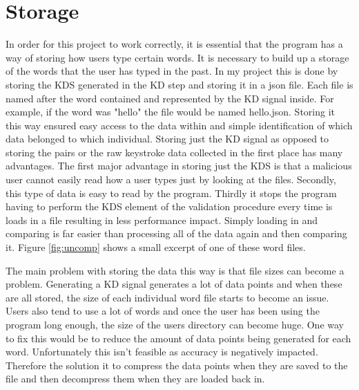 \documentclass[10pt,a4paper]{report}
\begin{document}
\section{Storage}
\label{sssec:Storage}
In order for this project to work correctly, it is essential that the program has a way of storing how users type certain words. It is necessary to build up a storage of the words that the user has typed in the past. In my project this is done by storing the KDS generated in the KD step and storing it in a json file. Each file is named after the word contained and represented by the KD signal inside. For example, if the word was "hello" the file would be named hello.json. Storing it this way ensured easy access to the data within and simple identification of which data belonged to which individual. Storing just the KD signal as opposed to storing the pairs or the raw keystroke data collected in the first place has many advantages. The first major advantage in storing just the KDS is that a malicious user cannot easily read how a user types just by looking at the files. Secondly, this type of data is easy to read by the program. Thirdly it stops the program having to perform the KDS element of the validation procedure every time is loads in a file resulting in less performance impact. Simply loading in and comparing is far easier than processing all of the data again and then comparing it. Figure \ref{fig:uncomp} shows a small excerpt of one of these word files.

The main problem with storing the data this way is that file sizes can become a problem. Generating a KD signal generates a lot of data points and when these are all stored, the size of each individual word file starts to become an issue. Users also tend to use a lot of words and once the user has been using the program long enough, the size of the users directory can become huge. One way to fix this would be to reduce the amount of data points being generated for each word. Unfortunately this isn't feasible as accuracy is negatively impacted. Therefore the solution it to compress the data points when they are saved to the file and then decompress them when they are loaded back in.
\end{document}
